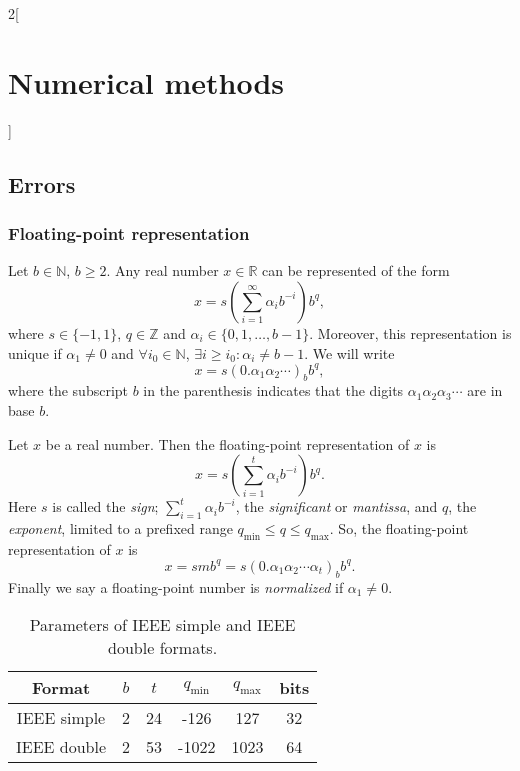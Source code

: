 \documentclass[class=article,10pt,crop=false]{standalone}
\begin{document}
\begin{multicols}{2}[\section{Numerical methods}]
\subsection{Errors}
\subsubsection*{Floating-point representation}
\begin{theorem}
Let $b\in\mathbb{N}$, $b\geq 2$. Any real number $x\in\mathbb{R}$ can be represented of the form 
\begin{equation*}
    x=s\left(\sum_{i=1}^\infty\alpha_ib^{-i}\right)b^q,
\end{equation*} where $s\in\{-1,1\}$, $q\in\mathbb{Z}$ and $\alpha_i\in\{0,1,\ldots,b-1\}$. Moreover, this representation is unique if $\alpha_1\ne0$ and $\forall i_0\in\mathbb{N}$, $\exists i\geq i_0:\alpha_i\ne b-1$. We will write $$x=s(0.\alpha_1\alpha_2\cdots)_bb^q,$$ where the subscript $b$ in the parenthesis indicates that the digits $\alpha_1\alpha_2\alpha_3\cdots$ are in base $b$.
\end{theorem}
\begin{definition}
Let $x$ be a real number. Then the floating-point representation of $x$ is $$x=s\left(\sum_{i=1}^t\alpha_ib^{-i}\right)b^q.$$ Here $s$ is called the \textit{sign}; $\sum_{i=1}^t\alpha_ib^{-i}$, the \textit{significant} or \textit{mantissa}, and $q$, the \textit{exponent}, limited to a prefixed range $q_\text{min}\leq q\leq q_\text{max}$. So, the floating-point representation of $x$ is $$x=smb^q=s(0.\alpha_1\alpha_2\cdots\alpha_t)_bb^q.$$ Finally we say a floating-point number is \textit{normalized} if $\alpha_1\ne0$.
\end{definition}
\begin{table}[ht]
    \centering
    \begin{tabular}{c|ccccc}
        Format & $b$ & $t$ & $q_\text{min}$ & $q_\text{max}$ & bits \\
        \hline\hline
        IEEE simple & 2 & 24 & -126 & 127 & 32\\
        IEEE double & 2 & 53 & -1022 & 1023 & 64
    \end{tabular}
    \caption{Parameters of IEEE simple and IEEE double formats.}
    \label{tab:my_label}

\end{table}
\end{multicols}
\end{document}

